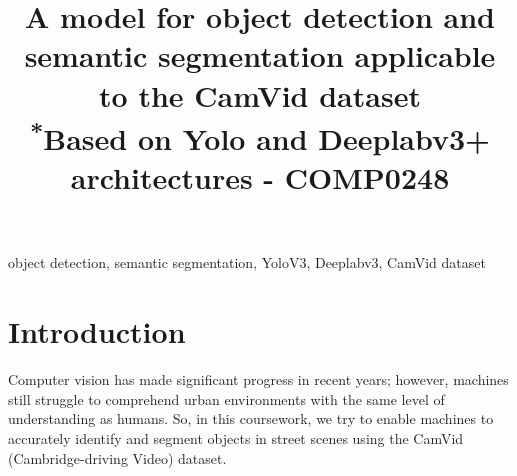 \documentclass[conference]{IEEEtran}
\begin{document}
\title{A model for object detection and semantic segmentation applicable to the CamVid dataset\\
{\footnotesize \textsuperscript{*}Based on Yolo and Deeplabv3+ architectures - COMP0248}
}

\author{}

\maketitle

\begin{abstract}


\end{abstract}

\begin{IEEEkeywords}
object detection, semantic segmentation, YoloV3, Deeplabv3, CamVid dataset
\end{IEEEkeywords}

\section{Introduction}




Computer vision has made significant progress in recent years; however, machines still struggle to comprehend urban environments with the same level of understanding as humans. So, in this coursework, we try to enable machines to accurately identify and segment objects in street scenes using the CamVid (Cambridge-driving Video) dataset.
 
\end{document}
